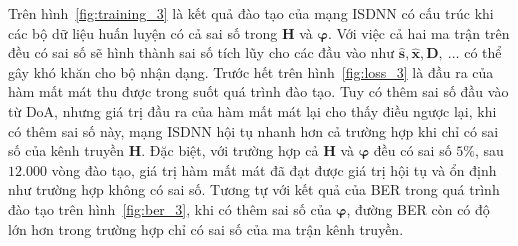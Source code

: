 Trên hình~\ref{fig:training_3} là kết quả đào tạo của mạng ISDNN có cấu trúc khi các bộ dữ liệu huấn luyện có cả sai số trong $\mathbf{H}$ và ${\boldsymbol{\varphi}}$. Với việc cả hai ma trận trên đều có sai số sẽ hình thành sai số tích lũy cho các đầu vào như $\hat{\mathbf{s}}, \hat{\mathbf{x}}, \mathbf{D},~\ldots$ có thể gây khó khăn cho bộ nhận dạng. Trước hết trên hình~\ref{fig:loss_3} là đầu ra của hàm mất mát thu được trong suốt quá trình đào tạo. Tuy có thêm sai số đầu vào từ DoA, nhưng giá trị đầu ra của hàm mất mát lại cho thấy điều ngược lại, khi có thêm sai số này, mạng ISDNN hội tụ nhanh hơn cả trường hợp khi chỉ có sai số của kênh truyền $\mathbf{H}$. Đặc biệt, với trường hợp cả $\mathbf{H}$ và ${\boldsymbol{\varphi}}$ đều có sai số $5\%$, sau $12.000$ vòng đào tạo, giá trị hàm mất mát đã đạt được giá trị hội tụ và ổn định như trường hợp không có sai số. Tương tự với kết quả của BER trong quá trình đào tạo trên hình~\ref{fig:ber_3}, khi có thêm sai số của $\boldsymbol{\varphi}$, đường BER còn có độ lớn hơn trong trường hợp chỉ có sai số của ma trận kênh truyền.
